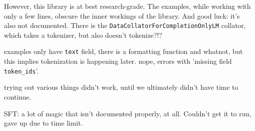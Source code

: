 {
\color{blue}
However, this library is at best research-grade. The examples, while working with only a few lines, obscure the inner workings of the library.
And good luck: it's also not documented. There is the \verb`DataCollatorForCompletionOnlyLM` collator, which takes a tokenizer, but also doesn't tokenize?!?

examples only have \verb`text` field, there is a formatting function and whatnot, but this implies tokenization is happening later. nope, errors with 'missing field \verb`token_ids`'.

trying out various things didn't work, until we ultimately didn't have time to continue.

SFT: a lot of magic that isn't documented properly, at all. Couldn't get it to run, gave up due to time limit.
}


